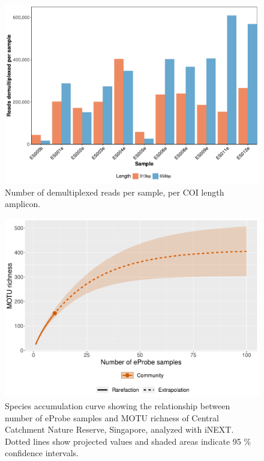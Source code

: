 \documentclass[journal=esthag,manuscript=article, layout=traditional, email=true]{achemso} %
\begin{document}
\begin{figure}[tbh]
    \centering
    \includegraphics[width=0.75\linewidth]{figures/S4_demult_barplot.pdf}
    \caption{Number of demultiplexed reads per sample, per COI length amplicon.}
    \label{fig:s3-reads}
\end{figure}

\begin{figure}[tbh]
    \centering
    \includegraphics[width=0.75\linewidth]{figures/S5_species_accum_curve.pdf}
    \caption{Species accumulation curve showing the relationship between number of eProbe samples and MOTU richness of Central Catchment Nature Reserve, Singapore, analyzed with iNEXT. Dotted lines show projected values and shaded areas indicate 95 \% confidence intervals.}
    \label{fig:s4-accumulation}
\end{figure}
\end{document}
